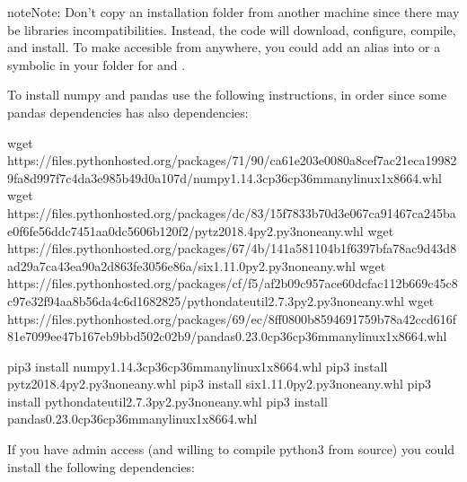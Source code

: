 \documentclass[letterpaper,10pt,english]{sphinxmanual}
\begin{document}
\begin{sphinxadmonition}{note}{Note:}
Don’t copy an installation folder from another machine since there may be
libraries incompatibilities. Instead, the code will download, configure,
compile, and install. To make accesible from anywhere, you could add an
alias into  or a symbolic in your  folder for
 and .
\end{sphinxadmonition}

To install numpy and pandas use the following instructions, in order since some
pandas dependencies has also dependencies:

%
\begin{sphinxVerbatim}[commandchars=\\\{\}]
wget https://files.pythonhosted.org/packages/71/90/ca61e203e0080a8cef7ac21eca199829fa8d997f7c4da3e985b49d0a107d/numpy\PYGZhy{}1.14.3\PYGZhy{}cp36\PYGZhy{}cp36m\PYGZhy{}manylinux1\PYGZus{}x86\PYGZus{}64.whl
wget https://files.pythonhosted.org/packages/dc/83/15f7833b70d3e067ca91467ca245bae0f6fe56ddc7451aa0dc5606b120f2/pytz\PYGZhy{}2018.4\PYGZhy{}py2.py3\PYGZhy{}none\PYGZhy{}any.whl
wget https://files.pythonhosted.org/packages/67/4b/141a581104b1f6397bfa78ac9d43d8ad29a7ca43ea90a2d863fe3056e86a/six\PYGZhy{}1.11.0\PYGZhy{}py2.py3\PYGZhy{}none\PYGZhy{}any.whl
wget https://files.pythonhosted.org/packages/cf/f5/af2b09c957ace60dcfac112b669c45c8c97e32f94aa8b56da4c6d1682825/python\PYGZus{}dateutil\PYGZhy{}2.7.3\PYGZhy{}py2.py3\PYGZhy{}none\PYGZhy{}any.whl
wget https://files.pythonhosted.org/packages/69/ec/8ff0800b8594691759b78a42ccd616f81e7099ee47b167eb9bbd502c02b9/pandas\PYGZhy{}0.23.0\PYGZhy{}cp36\PYGZhy{}cp36m\PYGZhy{}manylinux1\PYGZus{}x86\PYGZus{}64.whl

pip3 install numpy\PYGZhy{}1.14.3\PYGZhy{}cp36\PYGZhy{}cp36m\PYGZhy{}manylinux1\PYGZus{}x86\PYGZus{}64.whl
pip3 install pytz\PYGZhy{}2018.4\PYGZhy{}py2.py3\PYGZhy{}none\PYGZhy{}any.whl
pip3 install six\PYGZhy{}1.11.0\PYGZhy{}py2.py3\PYGZhy{}none\PYGZhy{}any.whl
pip3 install python\PYGZus{}dateutil\PYGZhy{}2.7.3\PYGZhy{}py2.py3\PYGZhy{}none\PYGZhy{}any.whl
pip3 install pandas\PYGZhy{}0.23.0\PYGZhy{}cp36\PYGZhy{}cp36m\PYGZhy{}manylinux1\PYGZus{}x86\PYGZus{}64.whl
\end{sphinxVerbatim}

If you have admin access (and willing to compile python3 from source) you could
install the following dependencies:
\end{document}
